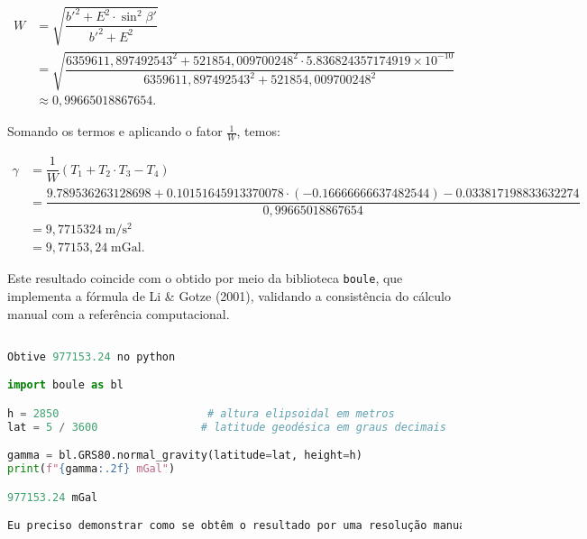 \[
\begin{aligned}
   W &= \sqrt{\dfrac{b'^2 + E^2 \cdot \sin^2\beta'}{b'^2 + E^2}} \\
     &= \sqrt{\dfrac{6359611{,}897492543^2 + 521854{,}009700248^2 \cdot 5.836824357174919 \times 10^{-10}}{6359611{,}897492543^2 + 521854{,}009700248^2}} \\
     &\approx 0{,}99665018867654 \text{.}
\end{aligned}
\]


\noindent
Somando os termos e aplicando o fator \(\frac{1}{W}\), temos:

\[
\begin{aligned}
   \gamma &= \dfrac{1}{W} \left( T_1 + T_2 \cdot T_3 - T_4 \right) \\
          &= \dfrac{ 9.789536263128698 + 0.10151645913370078 \cdot (-0.16666666637482544) - 0.033817198833632274}{0{,}99665018867654} \\
          &= 9{,}7715324\;\mathrm{m/s^2} \\
          &= 9{,}77153{,}24\;\mathrm{mGal} \text{.}
\end{aligned}
\]



\noindent
Este resultado coincide com o obtido por meio da biblioteca \texttt{boule}, que implementa a fórmula de Li \& Gotze (2001), validando a consistência do cálculo manual com a referência computacional.

\begin{lstlisting}[language=Python, caption={Cálculo da gravidade normal com a biblioteca \texttt{boule} 
para o modelo GRS80}]

Obtive 977153.24 no python

import boule as bl

h = 2850                       # altura elipsoidal em metros
lat = 5 / 3600                # latitude geodésica em graus decimais

gamma = bl.GRS80.normal_gravity(latitude=lat, height=h)
print(f"{gamma:.2f} mGal")

977153.24 mGal

Eu preciso demonstrar como se obtêm o resultado por uma resolução manual 
\end{lstlisting}


